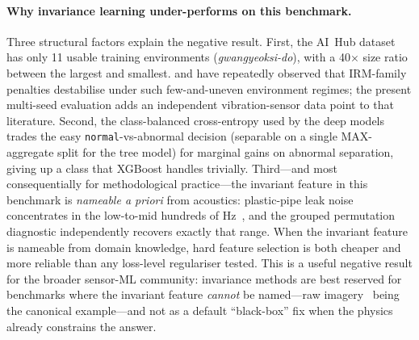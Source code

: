 \documentclass[3p,times,authoryear]{elsarticle}
\theoremstyle{remark}
\begin{document}
\paragraph{Why invariance learning under-performs on this benchmark.}
Three structural factors explain the negative result. First,
the AI~Hub dataset has only 11 usable training environments
(\textit{gwangyeoksi-do}), with a 40$\times$ size ratio between the
largest and smallest. \citet{gulrajani2021dg} and
\citet{rosenfeld2021irm} have repeatedly observed that
IRM-family penalties destabilise under such few-and-uneven
environment regimes; the present multi-seed evaluation
adds an independent vibration-sensor data point to that
literature. Second, the class-balanced cross-entropy used by
the deep models trades the easy \texttt{normal}-vs-abnormal
decision (separable on a single MAX-aggregate split for the
tree model) for marginal gains on abnormal separation, giving
up a class that XGBoost handles trivially.
Third---and most consequentially for methodological
practice---the invariant feature in this benchmark is
\emph{nameable a priori} from acoustics: plastic-pipe leak
noise concentrates in the low-to-mid hundreds of
Hz~\cite{hunaidi2000plastic,almeida2014leak,gao2017model},
and the grouped permutation diagnostic independently recovers
exactly that range. When the invariant feature is nameable
from domain knowledge, hard feature selection is both cheaper
and more reliable than any loss-level regulariser tested.
This is a useful negative result for the broader sensor-ML
community: invariance methods are best reserved for benchmarks
where the invariant feature \emph{cannot} be named---raw
imagery~\cite{beery2018terra} being the canonical
example---and not as a default ``black-box'' fix when the
physics already constrains the answer.

\begin{table}[!htbp]
\caption{Invariance-regularised deep models versus causal
XGBoost on the Chungbuk LORO fold. Multi-seed mean~$\pm$~std
over $n{=}5$ seeds for the deep rows; XGBoost is
deterministic.\label{tab:irm}}
\centering
\scriptsize
\setlength{\tabcolsep}{2pt}
\end{table}
\end{document}
